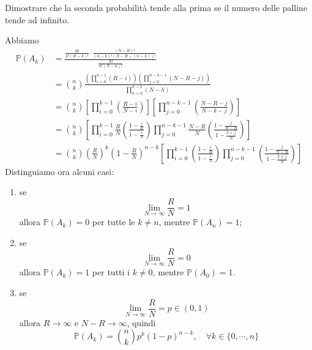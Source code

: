 \documentclass[a4paper]{article}
\begin{document}
\begin{snippetexercise}{}
    Dimostrare che la seconda probabilità tende alla prima se il numero delle palline
    tende ad infinito.
\end{snippetexercise}

\begin{snippetsolution}{}
    Abbiamo
    \begin{align*}
        \mathbb P(A_k) &= \frac{
            \frac{R!}{k!(R-k)!} \cdot \frac{(N-R)!}{(n-k)!(N-R-(n-k))!}
        }{
            \frac{N!}{n!(N-n)!}
        } \\
        &= \binom{n}{k} \frac{
            \left(\prod_{i=0}^{k-1}(R-i)\right)
            \left(\prod_{j=0}^{n-k-1}(N-R-j)\right)
        }{
            \prod_{h=0}^{n-1}(N-h)
        } \\
        &= \binom{n}{k} \left[
            \prod_{i=0}^{k-1} \left(\frac{R-i}{N-i}\right)
        \right] \left[
            \prod_{j=0}^{n-k-1} \left(
                \frac{N-R-j}{N-k-j}
            \right)
        \right] \\
        &= \binom{n}{k} \left[
            \prod_{i=0}^{k-1} \frac{R}{N} \left(
                \frac{1 - \frac{i}{R}}{1 - \frac{i}{N}}
            \right)
            \prod_{j=0}^{n-k-1} \frac{N-R}{N}\left(
                \frac{
                    1 - \frac{j}{N-R}
                }{
                    1 - \frac{k+j}{N}
                }
            \right)
        \right] \\
        &= \binom{n}{k} \left(\frac{R}{N}\right)^k \left(1 - \frac{R}{N}\right)^{n-k}
        \left[
            \prod_{i=0}^{k-1} \left(
                \frac{1 - \frac{i}{R}}{1 - \frac{i}{N}}
            \right)
            \prod_{j=0}^{n-k-1} \left(\frac{1 - \frac{j}{N-R}}{1 - \frac{k+j}{N}}\right)
        \right]
    \end{align*}
    Distinguiamo ora alcuni casi:
    \begin{enumerate}
        \item se \[
                \lim_{N \to \infty} \frac{R}{N} = 1
            \]
            allora \(\mathbb P(A_k) = 0\) per tutte le \(k\neq n\), mentre \(\mathbb P(A_n) = 1\);
        \item se \[
                \lim_{N \to \infty} \frac{R}{N} = 0
            \]
            allora \(\mathbb P(A_k) = 1\) per tutti i \(k \neq 0\), mentre \(\mathbb P(A_0) = 1\).
        \item se \[
                \lim_{N \to \infty} \frac{R}{N} = p \in (0,1)
            \]
            allora \(R \to \infty\) e \(N-R\to \infty\), quindi
            \[
                \mathbb P(A_k) = \binom{n}{k} p^k (1-p)^{n-k}, \quad \forall k \in \{0, \cdots, n\}
            \]
    \end{enumerate}
\end{snippetsolution}
\end{document}
